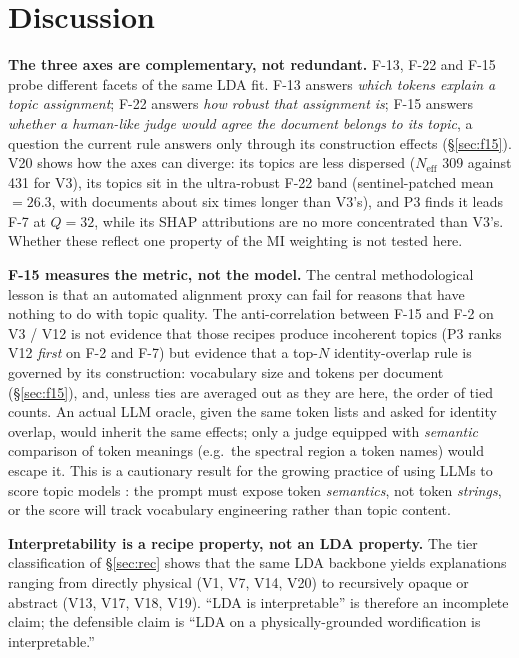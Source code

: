 \documentclass[journal,a4paper,10pt]{IEEEtran}
\begin{document}
\section{Discussion}\label{sec:discussion}

\textbf{The three axes are complementary, not redundant.} F-13, F-22
and F-15 probe different facets of the same LDA fit. F-13 answers
\emph{which tokens explain a topic assignment}; F-22 answers
\emph{how robust that assignment is}; F-15 answers \emph{whether a
human-like judge would agree the document belongs to its topic}, a
question the current rule answers only through its construction
effects (\S\ref{sec:f15}). V20 shows how the axes can diverge: its
topics are less dispersed ($N_{\mathrm{eff}}$ 309 against 431 for V3),
its topics sit in the ultra-robust F-22 band (sentinel-patched mean
$=26.3$, with documents about six times longer than V3's), and P3 finds
it leads F-7 at $Q=32$, while its SHAP attributions are no more
concentrated than V3's. Whether these reflect one property of the MI
weighting is not tested here.

\textbf{F-15 measures the metric, not the model.} The central
methodological lesson is that an automated alignment proxy can fail
for reasons that have nothing to do with topic quality. The
anti-correlation between F-15 and F-2 on V3 / V12 is not evidence that
those recipes produce incoherent topics (P3 ranks V12 \emph{first}
on F-2 and F-7) but evidence that a top-$N$ identity-overlap rule is
governed by its construction: vocabulary size and tokens per document
(\S\ref{sec:f15}), and, unless ties are averaged out as they are here,
the order of tied counts. An actual LLM oracle, given
the same token lists and asked for identity overlap, would inherit the
same effects; only a judge equipped with
\emph{semantic} comparison of token meanings (e.g.\ the spectral
region a token names) would escape it. This is a cautionary result for
the growing practice of using LLMs to score topic models
\cite{stammbach2023revisiting}: the prompt must
expose token \emph{semantics}, not token \emph{strings}, or the score
will track vocabulary engineering rather than topic content.

\textbf{Interpretability is a recipe property, not an LDA property.}
The tier classification of \S\ref{sec:rec} shows that the same LDA
backbone yields explanations ranging from directly physical (V1, V7,
V14, V20) to recursively opaque or abstract (V13, V17, V18, V19). ``LDA is
interpretable'' is therefore an incomplete claim; the defensible claim
is ``LDA on a physically-grounded wordification is interpretable.''
\end{document}
